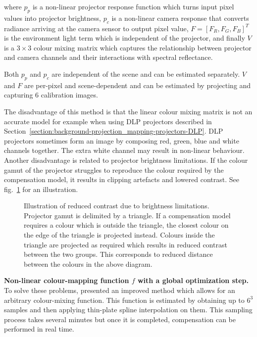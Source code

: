 where \(p_p\) is a non-linear projector response function which turns input pixel values into projector brightness, \(p_c\) is a non-linear camera response that converts radiance arriving at the camera sensor to output pixel value, \(F = [F_R, F_G, F_B]^T\) is the environment light term which is independent of the projector, and finally \(V\) is a \(3 \times 3\) colour mixing matrix which captures the relationship between projector and camera channels and their interactions with spectral reflectance.

Both \(p_p\) and \(p_c\) are independent of the scene and can be estimated separately. \(V\) and \(F\) are per-pixel and scene-dependent and can be estimated by projecting and capturing 6 calibration images.

The disadvantage of this method is that the linear colour mixing matrix is not an accurate model for example when using DLP projectors described in Section~\ref{section:background-projection_mapping-projectors-DLP}. DLP projectors sometimes form an image by composing red, green, blue and white channels together. The extra white channel may result in non-linear behaviour. Another disadvantage is related to projector brightness limitations. If the colour gamut of the projector struggles to reproduce the colour required by the compensation model, it results in clipping artefacts and lowered contrast. See fig.~\ref{fig:background_clipping} for an illustration.

\begin{figure}[ht]
    \centering
    \def\svgwidth{0.4\textwidth}
    
    \caption{Illustration of reduced contrast due to brightness limitations. Projector gamut is delimited by a triangle. If a compensation model requires a colour which is outside the triangle, the closest colour on the edge of the triangle is projected instead. Colours inside the triangle are projected as required which results in reduced contrast between the two groups. This corresponds to reduced distance between the colours in the above diagram.}
    \label{fig:background_clipping}
\end{figure}

\textbf{Non-linear colour-mapping function \(f\) with a global optimization step.} To solve these problems, \citet{Grundhofer2015} presented an improved method which allows for an arbitrary colour-mixing function. This function is estimated by obtaining up to \(6^3\) samples and then applying thin-plate spline interpolation on them. This sampling process takes several minutes but once it is completed, compensation can be performed in real time.


